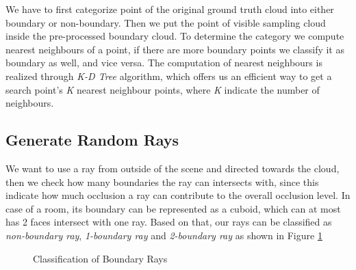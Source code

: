 \documentclass[11pt, a4paper,oneside,chapterprefix=false]{scrbook}
\begin{document}
We have to first categorize point of the original ground truth cloud into either boundary or non-boundary. 
Then we put the point of visible sampling cloud inside the pre-processed boundary cloud. To determine the category we compute nearest neighbours of a point, if there are more boundary points we classify it as boundary as well, and vice versa. The computation of nearest neighbours is realized through \emph{K-D Tree} algorithm, which offers us an efficient way to get a search point's \emph{K} nearest neighbour points, where \emph{K} indicate the number of neighbours.


\subsection{Generate Random Rays}

We want to use a ray from outside of the scene and directed towards the cloud, then we check how many boundaries the ray can intersects with, since this indicate how much occlusion a ray can contribute to the overall occlusion level. In case of a room, its boundary can be represented as a cuboid, which can at most has 2 faces intersect with one ray. Based on that, our rays can be classified as \emph{non-boundary ray}, \emph{1-boundary ray} and \emph{2-boundary ray} as shown in Figure \ref{classification of bound ray}

\begin{figure}[H]
    \centering
     \label{fig:non-bound ray}
     \label{fig:1-bound ray}
      \label{fig:2-bounds ray} 
    \caption{Classification of Boundary Rays}
    \label{classification of bound ray}
\end{figure}
\end{document}
